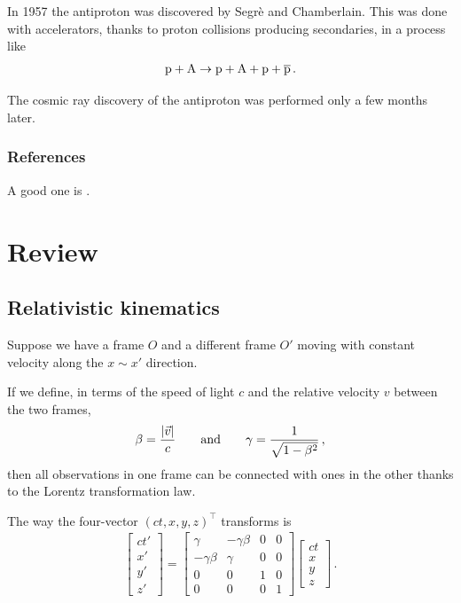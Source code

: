 \documentclass[main.tex]{subfiles}
\begin{document}
In 1957 the antiproton was discovered by Segrè and Chamberlain.
This was done with accelerators, thanks to proton collisions producing secondaries, in a process like 
%
\begin{align}
\ce{p} + \ce{A} \to \ce{p} + \ce{A} + \ce{p} + \ce{\overline{p}}
\,.
\end{align}
%
 
The cosmic ray discovery of the antiproton was performed only a few months later. 


\subsubsection*{References}

A good one is \textcite{aloisioSelectedTopicsCosmic2018}.

\section{Review}

\subsection{Relativistic kinematics}

Suppose we have a frame \(O\) and a different frame \(O'\) moving with constant velocity along the \(x \sim x'\) direction. 

If we define, in terms of the speed of light \(c\) and the relative velocity \(v\) between the two frames,
%
\begin{align}
\beta  = \frac{\abs{\vec{v}}}{c} \qquad \text{and} \qquad
\gamma = \frac{1}{\sqrt{1 - \beta^2}}
\,,
\end{align}
%
then all observations in one frame can be connected with ones in the other thanks to the Lorentz transformation law. 

The way the four-vector \((ct, x, y, z)^{\top}\) transforms is 
%
\begin{align}
\left[\begin{array}{c}
ct' \\ 
x' \\ 
y' \\ 
z'
\end{array}\right]
= \left[\begin{array}{cccc}
\gamma  & -\gamma \beta  & 0 & 0 \\ 
-\gamma \beta  & \gamma  & 0 & 0 \\ 
0 & 0 & 1 & 0 \\ 
0 & 0 & 0 & 1
\end{array}\right]
\left[\begin{array}{c}
ct \\ 
x \\ 
y \\ 
z
\end{array}\right]
\,.
\end{align}
\end{document}
